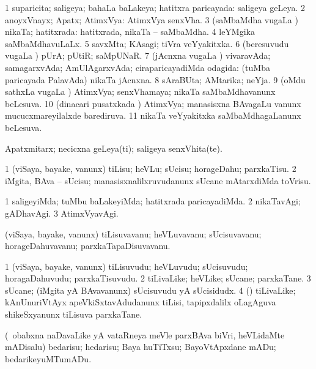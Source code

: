 \bentry
{}
\gl{\gu}
\bmng
\bnum
\num{1} suparicita; saligeya; bahaLa baLakeya; hatitxra paricayada:  saligeya geLeya. 
\num{2} anoyxVnayx; Apatx; AtimxVya:  AtimxVya senxVha. 
\num{3} (saMbaMdha \mo vugaLa \vi) nikaTa; hatitxrada:  hatitxrada, nikaTa -- saMbaMdha. 
\num{4} leYMgika saMbaMdhavuLaLx. 
\num{5} savxMta; KAsagi; tiVra veYyakitxka. 
\num{6} (beresuvudu \mo vugaLa \vi) pUrA; pUtiR; saMpUNaR. 
\num{7} (jAcnxna \mo vugaLa \vi) vivaravAda; samagarxvAda; AmUlAgarxvAda; ciraparicayadiMda odagida:  (tuMba paricayada PalavAda) nikaTa jAcnxna. 
\num{8} sAraBUta; AMtarika; neYja. 
\num{9} (oMdu sathxLa \mo vugaLa \vi) AtimxVya; senxVhamaya; nikaTa saMbaMdhavanunx beLesuva. 
\num{10} (dinacari pusatxkada \vi) AtimxVya; manasisxna BAvagaLu \mo vanunx mucucxmareyilalxde barediruva. 
\num{11} nikaTa veYyakitxka saMbaMdhagaLanunx beLesuva. 
\enum
\emng
\eentry

\bentry
{}
\gl{\nA}
\bmng
Apatxmitarx; necicxna geLeya(ti); saligeya senxVhita(te). 
\emng
\eentry

\bentry
{}
\gl{\sakirx}
\bmng
\bnum
\num{1} (viSaya, bayake, \mo vanunx) tiLisu; heVLu; sUcisu; horageDahu; parxkaTisu. 
\num{2} iMgita, BAva -- sUcisu; manasisxnalilxruvudanunx sUcane mAtarxdiMda toVrisu. 
\enum
\emng
\eentry

\bentry
{}
\gl{\kirxvi}
\bmng
\bnum
\num{1} saligeyiMda; tuMbu baLakeyiMda; hatitxrada paricayadiMda. 
\num{2} nikaTavAgi; gADhavAgi. 
\num{3} AtimxVyavAgi. 
\enum
\emng
\eentry

\bentry
{}
\gl{\nA}
\bmng
(viSaya, bayake, \mo vanunx) tiLisuvavanu; heVLuvavanu; sUcisuvavanu; horageDahuvavanu; parxkaTapaDisuvavanu. 
\emng
\eentry

\bentry
{}
\gl{\nA}
\bmng
\bnum
\num{1} (viSaya, bayake, \mo vanunx) tiLisuvudu; heVLuvudu; sUcisuvudu; horagaDahuvudu; parxkaTisuvudu. 
\num{2} tiLivaLike; heVLike; sUcane; parxkaTane. 
\num{3} sUcane; (iMgita yA BAvavanunx) sUcisuvudu yA sUcisidudx. 
\num{4} (\nAyxshA) tiLivaLike; kAnUnuriVtAyx apeVkiSxtavAdudanunx tiLisi, tapipxdalilx oLagAguva shikeSxyanunx tiLisuva parxkaTane. 
\enum
\emng
\eentry

\bentry
{}
\gl{\sakirx}
\bmng
(\kanmu\ obabxna naDavaLike yA vataRneya meVle parxBAva biVri, heVLidaMte mADisalu) bedarisu; hedarisu; Baya huTiTxsu; BayoVtApxdane mADu; bedarikeyuMTumADu. 
\emng
\eentry

